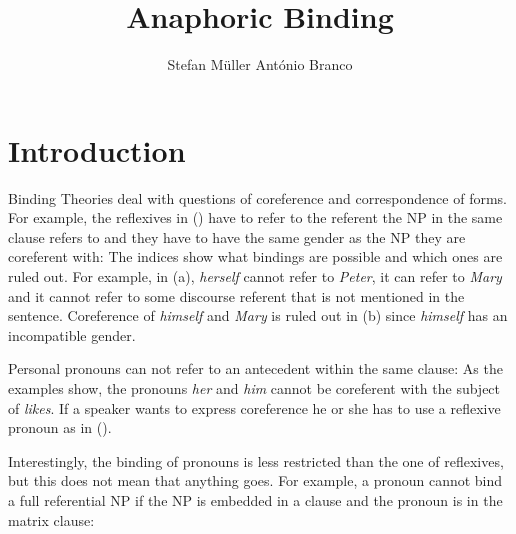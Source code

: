 \documentclass[output=paper
                ,modfonts
                ,nonflat
	        ,collection
	        ,collectionchapter
	        ,collectiontoclongg
 	        ,biblatex
                ,babelshorthands
                ,newtxmath
                ,draftmode
                ,colorlinks, citecolor=brown
]{./langsci/langscibook}
\title{Anaphoric Binding}
\author{%
Stefan Müller\affiliation{Humboldt-Universität zu Berlin} \lastand António Branco\affiliation{University of Lisbon}
}
\begin{document}
\maketitle

\label{chap-binding}

\section{Introduction} 

Binding Theories deal with questions of coreference and correspondence of forms. For example, the
reflexives in () have to refer to the referent the NP in the same clause refers to and they
have to have the same gender as the NP they are coreferent with:
\eal
{}
\zl
The indices show what bindings are possible and which ones are ruled out. For example, in
(a), \emph{herself} cannot refer to \emph{Peter}, it can refer to \emph{Mary} and it cannot
refer to some discourse referent that is not mentioned in the sentence. Coreference of
\emph{himself} and \emph{Mary} is ruled out in (b) since \emph{himself} has an incompatible gender.

Personal pronouns can not refer to an antecedent within the same clause:
\eal
{}
\zl
As the examples show, the pronouns \emph{her} and \emph{him} cannot be coreferent with the subject
of \emph{likes}. If a speaker wants to express coreference he or she has to use a reflexive pronoun
as in (). 

Interestingly, the binding of pronouns is less restricted than the one of reflexives, but this does
not mean that anything goes. For example, a pronoun cannot bind a full referential NP if the NP is
embedded in a clause and the pronoun is in the matrix clause:
\eal
{}
\zl  
\end{document}
